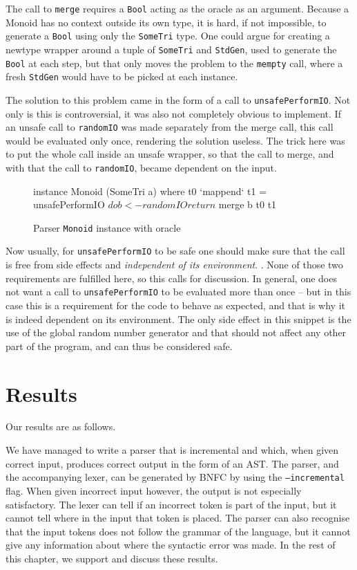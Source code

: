 \documentclass[a4paper,12pt,twosided]{report}
\renewcommand\cite{\citep}
\begin{document}
The call to \texttt{merge} requires a \texttt{Bool} acting as the oracle as an
argument. Because a Monoid has no context outside its own type, it is hard, if not
impossible, to generate a \texttt{Bool} using only the \texttt{SomeTri} type.
One could argue for creating a newtype wrapper around a tuple of
\texttt{SomeTri} and \texttt{StdGen}, used to generate the \texttt{Bool} at each
step, but that only moves the problem to the \texttt{mempty}
call, where a fresh \texttt{StdGen} would have to be picked at each instance.

The solution to this problem came in the form of a call to
\texttt{unsafePerformIO}.  Not only is this is controversial, it was also not
completely obvious to implement. If an unsafe call to \texttt{randomIO} was made
separately from the merge call, this call would be evaluated only once,
rendering the solution useless. The trick here was to put the whole call inside
an unsafe wrapper, so that the call to merge, and with that the call to
\texttt{randomIO}, became dependent on the input.

\begin{figure}[H]
\begin{code}
instance Monoid (SomeTri a) where
    t0 `mappend` t1 = unsafePerformIO $ do
      b <- randomIO
      return $ merge b t0 t1
\end{code}
\caption{Parser \texttt{Monoid} instance with oracle}
\end{figure}

Now usually, for \texttt{unsafePerformIO} to be safe one should make sure that
the call is free from side effects and \textit{independent of its environment}.
\cite{unsafeHackage}. None of those two requirements are fulfilled here, so 
this calls for discussion. In general, one does not want a call to
\texttt{unsafePerformIO} to be evaluated more than once -- but in this case this
is a requirement for the code to behave as expected, and that is why it is indeed
dependent on its environment. The only side effect in this snippet is the use of
the global random number generator and that should not affect any other part of
the program, and can thus be considered safe.

%
%

\chapter{Results}
Our results are as follows.

We have managed to write a parser that is incremental and which, when given
correct input, produces correct output in the form of an AST. The parser, and
the accompanying lexer, can be generated by BNFC by using the
\texttt{---incremental} flag. When given incorrect input however, the output is
not especially satisfactory. The lexer can tell if an incorrect token is part of
the input, but it cannot tell where in the input that token is placed. The
parser can also recognise that the input tokens does not follow the grammar of
the language, but it cannot give any information about where the syntactic error
was made. In the rest of this chapter, we support and discuss these results. 
\end{document}
